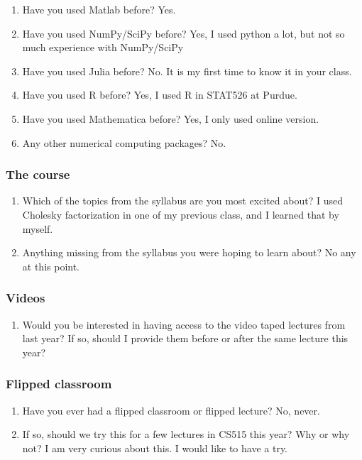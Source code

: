 \documentclass{article}
\begin{document}
\begin{enumerate}%
\item Have you used Matlab before?
Yes. 

\item Have you used NumPy/SciPy before?
Yes, I used python a lot, but not so much experience with NumPy/SciPy

\item Have you used Julia before?
No. It is my first time to know it in your class. 

\item Have you used R before?
Yes, I used R in STAT526 at Purdue. 

\item Have you used Mathematica before?
Yes, I only used online version. 

\item Any other numerical computing packages?
No. 


\end{enumerate}
\hypertarget{the_course_4}{}\subsubsection*{{The course}}\label{the_course_4}

\begin{enumerate}%
\item Which of the topics from the syllabus are you most excited about?
I used Cholesky factorization in one of my previous class, and I learned that by myself.  

\item Anything missing from the syllabus you were hoping to learn about?
No any at this point. 


\end{enumerate}
\hypertarget{videos_5}{}\subsubsection*{{Videos}}\label{videos_5}

\begin{enumerate}%
\item Would you be interested in having access to the video taped lectures from last year? If so, should I provide them before or after the same lecture this year?

\end{enumerate}
\hypertarget{flipped_classroom_6}{}\subsubsection*{{Flipped classroom}}\label{flipped_classroom_6}

\begin{enumerate}%
\item Have you ever had a flipped classroom or flipped lecture?
No, never. 

\item If so, should we try this for a few lectures in CS515 this year? Why or why not?
I am very curious about this. I would like to have a try. 


\end{enumerate}
\end{document}
